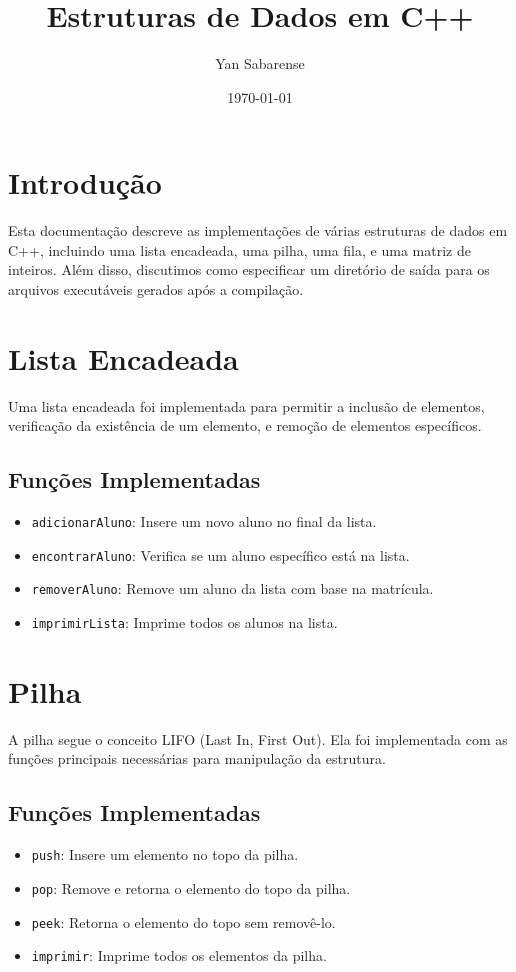 \documentclass{article}
\title{Estruturas de Dados em C++}
\author{Yan Sabarense}
\date{\today}
\begin{document}
\maketitle

\section{Introdução}
Esta documentação descreve as implementações de várias estruturas de dados em C++, incluindo uma lista encadeada, uma pilha, uma fila, e uma matriz de inteiros. Além disso, discutimos como especificar um diretório de saída para os arquivos executáveis gerados após a compilação.

\section{Lista Encadeada}
Uma lista encadeada foi implementada para permitir a inclusão de elementos, verificação da existência de um elemento, e remoção de elementos específicos. 

\subsection{Funções Implementadas}
\begin{itemize}
    \item \texttt{adicionarAluno}: Insere um novo aluno no final da lista.
    \item \texttt{encontrarAluno}: Verifica se um aluno específico está na lista.
    \item \texttt{removerAluno}: Remove um aluno da lista com base na matrícula.
    \item \texttt{imprimirLista}: Imprime todos os alunos na lista.
\end{itemize}

\section{Pilha}
A pilha segue o conceito LIFO (Last In, First Out). Ela foi implementada com as funções principais necessárias para manipulação da estrutura.

\subsection{Funções Implementadas}
\begin{itemize}
    \item \texttt{push}: Insere um elemento no topo da pilha.
    \item \texttt{pop}: Remove e retorna o elemento do topo da pilha.
    \item \texttt{peek}: Retorna o elemento do topo sem removê-lo.
    \item \texttt{imprimir}: Imprime todos os elementos da pilha.
\end{itemize}
\end{document}
